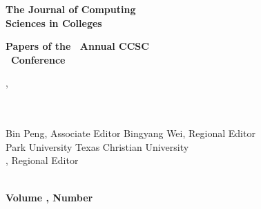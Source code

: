 \begin{textsf}

\begin{center}
\textbf{\Huge{
The Journal of Computing\\
Sciences in Colleges\\
}
}
\end{center}

\vspace{10pt}
\vspace{10pt}
\vspace{10pt}

\begin{center}
\textbf{\Large{
Papers of the \confOrdinal\ Annual CCSC\\
\confName\ Conference\\
}}
\end{center}

\vspace{10pt}

\begingroup
\centering
\large{\confDates, \confYear}\\
\large{\confSchool}\\
\large{\confCity}\\
\endgroup

\vfill

{\parindent0pt
Bin Peng, Associate Editor  \hfill Bingyang Wei, Regional Editor\\
Park University             \hfill Texas Christian University\\
\null \hfill \regionalEditor, Regional Editor\\
\null \hfill \regionalEditorSchool\\
}

\vspace{10pt}

{\parindent0pt
\textbf{\Large Volume \journalVolume, Number \journalNumber} \hfill
\textbf{\Large \journalMonth\ \journalYear}\\
}
\end{textsf}
